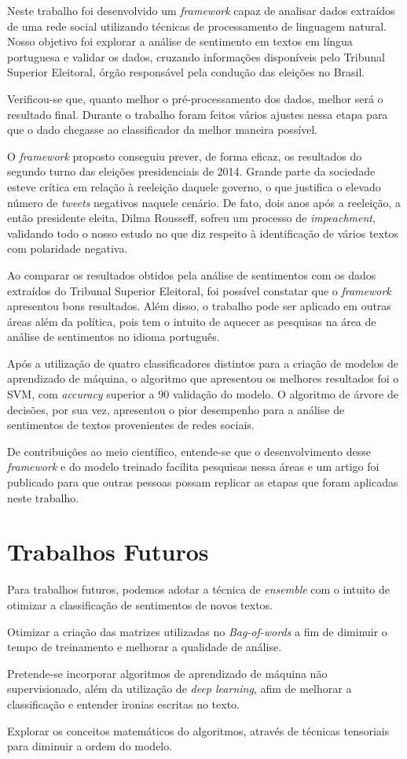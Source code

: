 Neste trabalho foi desenvolvido um \textit{framework} capaz de
analisar dados extraídos de uma rede social utilizando técnicas
de processamento de linguagem natural. Nosso objetivo foi
explorar a análise de sentimento em textos em língua portuguesa e
validar os dados, cruzando informações disponíveis pelo Tribunal Superior Eleitoral, órgão
responsável pela condução das eleições no Brasil.


Verificou-se que, quanto melhor o pré-processamento dos dados, melhor será o resultado final. Durante o trabalho foram feitos vários ajustes nessa
etapa para que o dado chegasse ao classificador da melhor maneira possível.

O \textit{framework} proposto conseguiu prever, de forma eficaz, os resultados do segundo turno das eleições presidenciais de 2014. 
Grande parte da sociedade esteve crítica em relação à reeleição daquele governo, o que justifica o elevado número de \textit{tweets} negativos
 naquele cenário. De fato, dois anos após a reeleição, a então presidente 
eleita, Dilma Rousseff, sofreu um processo de \textit{impeachment}, validando todo o nosso estudo no que diz respeito à identificação de 
vários textos com polaridade negativa.

Ao comparar os resultados obtidos pela análise de sentimentos com os dados extraídos do Tribunal Superior Eleitoral, 
foi possível constatar que o \textit{framework} apresentou bons resultados. 
Além disso, o trabalho pode ser aplicado em outras áreas além da política, pois tem o intuito
de aquecer as pesquisas na área de análise de sentimentos no idioma português.

Após a utilização de quatro classificadores distintos para a criação de modelos de aprendizado de máquina, 
o algoritmo que apresentou os melhores resultados foi o \acrshort{SVM}, com \textit{accuracy} superior a 90%
validação do modelo. 
O algoritmo de árvore de decisões, por sua vez, apresentou o pior desempenho para a análise de sentimentos de textos provenientes
de redes sociais.

De contribuições ao meio científico, entende-se que o desenvolvimento desse \textit{framework} e do modelo treinado facilita
pesquisas nessa áreas e um artigo foi publicado para que outras pessoas possam replicar as etapas que foram aplicadas neste trabalho.

\section{Trabalhos Futuros}
Para trabalhos futuros, podemos adotar a técnica de \textit{ensemble}
com o intuito de otimizar a classificação de sentimentos de novos textos. 

Otimizar a criação das matrizes utilizadas no \textit{Bag-of-words} a fim de diminuir 
o tempo de treinamento e melhorar a qualidade de análise.

Pretende-se incorporar algoritmos de aprendizado de máquina não supervisionado, além da 
utilização de \textit{deep learning}, afim de melhorar a classificação e entender ironias escritas 
no texto.

Explorar os conceitos matemáticos do algoritmos, através de técnicas tensoriais para diminuir a ordem do modelo.

